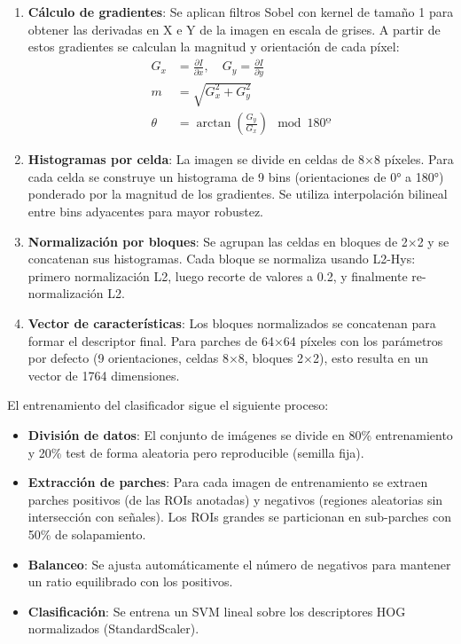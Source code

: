 \documentclass[11pt,a4paper]{article}
\begin{document}
\begin{enumerate}
    \item \textbf{Cálculo de gradientes}: Se aplican filtros Sobel con kernel de tamaño 1 
    para obtener las derivadas en X e Y de la imagen en escala de grises. A partir de 
    estos gradientes se calculan la magnitud y orientación de cada píxel:
    \begin{align}
        G_x &= \frac{\partial I}{\partial x}, \quad G_y = \frac{\partial I}{\partial y} \\
        m &= \sqrt{G_x^2 + G_y^2} \\
        \theta &= \arctan\left(\frac{G_y}{G_x}\right) \mod 180º
    \end{align}
    
    \item \textbf{Histogramas por celda}: La imagen se divide en celdas de 8$\times$8 píxeles. 
    Para cada celda se construye un histograma de 9 bins (orientaciones de 0° a 180°) 
    ponderado por la magnitud de los gradientes. Se utiliza interpolación bilineal 
    entre bins adyacentes para mayor robustez.
    
    \item \textbf{Normalización por bloques}: Se agrupan las celdas en bloques de 2$\times$2 
    y se concatenan sus histogramas. Cada bloque se normaliza usando L2-Hys: 
    primero normalización L2, luego recorte de valores a 0.2, y finalmente 
    re-normalización L2.
    
    \item \textbf{Vector de características}: Los bloques normalizados se concatenan 
    para formar el descriptor final. Para parches de 64$\times$64 píxeles con los parámetros 
    por defecto (9 orientaciones, celdas 8$\times$8, bloques 2$\times$2), esto resulta en un vector 
    de 1764 dimensiones.
\end{enumerate}

El entrenamiento del clasificador sigue el siguiente proceso:
\begin{itemize}
    \item \textbf{División de datos}: El conjunto de imágenes se divide en 80\% entrenamiento 
    y 20\% test de forma aleatoria pero reproducible (semilla fija).
    
    \item \textbf{Extracción de parches}: Para cada imagen de entrenamiento se extraen 
    parches positivos (de las ROIs anotadas) y negativos (regiones aleatorias sin 
    intersección con señales). Los ROIs grandes se particionan en sub-parches con 
    50\% de solapamiento.
    
    \item \textbf{Balanceo}: Se ajusta automáticamente el número de negativos para 
    mantener un ratio equilibrado con los positivos.
    
    \item \textbf{Clasificación}: Se entrena un SVM lineal sobre los descriptores HOG 
    normalizados (StandardScaler).
\end{itemize}
\end{document}
